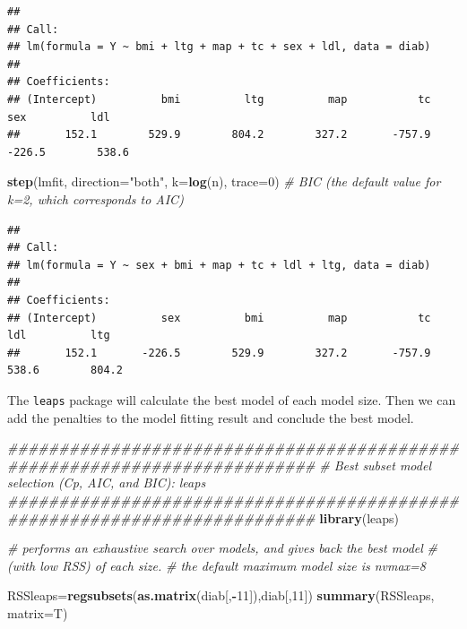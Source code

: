 \documentclass[
]{book}
\newenvironment{Shaded}{\begin{snugshade}}{\end{snugshade}}
\newcommand{\CommentTok}[1]{\textcolor[rgb]{0.56,0.35,0.01}{\textit{#1}}}
\newcommand{\DataTypeTok}[1]{\textcolor[rgb]{0.13,0.29,0.53}{#1}}
\newcommand{\DecValTok}[1]{\textcolor[rgb]{0.00,0.00,0.81}{#1}}
\newcommand{\KeywordTok}[1]{\textcolor[rgb]{0.13,0.29,0.53}{\textbf{#1}}}
\newcommand{\NormalTok}[1]{#1}
\newcommand{\OperatorTok}[1]{\textcolor[rgb]{0.81,0.36,0.00}{\textbf{#1}}}
\newcommand{\StringTok}[1]{\textcolor[rgb]{0.31,0.60,0.02}{#1}}
\begin{document}
\begin{verbatim}
## 
## Call:
## lm(formula = Y ~ bmi + ltg + map + tc + sex + ldl, data = diab)
## 
## Coefficients:
## (Intercept)          bmi          ltg          map           tc          sex          ldl  
##       152.1        529.9        804.2        327.2       -757.9       -226.5        538.6
\end{verbatim}

\begin{Shaded}
\begin{Highlighting}[]
    \KeywordTok{step}\NormalTok{(lmfit, }\DataTypeTok{direction=}\StringTok{"both"}\NormalTok{, }\DataTypeTok{k=}\KeywordTok{log}\NormalTok{(n), }\DataTypeTok{trace=}\DecValTok{0}\NormalTok{)  }\CommentTok{# BIC (the default value for k=2, which corresponds to AIC)}
\end{Highlighting}
\end{Shaded}

\begin{verbatim}
## 
## Call:
## lm(formula = Y ~ sex + bmi + map + tc + ldl + ltg, data = diab)
## 
## Coefficients:
## (Intercept)          sex          bmi          map           tc          ldl          ltg  
##       152.1       -226.5        529.9        327.2       -757.9        538.6        804.2
\end{verbatim}

The \texttt{leaps} package will calculate the best model of each model size. Then we can add the penalties to the model fitting result and conclude the best model.

\begin{Shaded}
\begin{Highlighting}[]
    \CommentTok{##########################################################################}
    \CommentTok{# Best subset model selection (Cp, AIC, and BIC): leaps }
    \CommentTok{##########################################################################}
    \KeywordTok{library}\NormalTok{(leaps)}
    
    \CommentTok{# performs an exhaustive search over models, and gives back the best model }
    \CommentTok{# (with low RSS) of each size.}
    \CommentTok{# the default maximum model size is nvmax=8}
    
\NormalTok{    RSSleaps=}\KeywordTok{regsubsets}\NormalTok{(}\KeywordTok{as.matrix}\NormalTok{(diab[,}\OperatorTok{-}\DecValTok{11}\NormalTok{]),diab[,}\DecValTok{11}\NormalTok{])}
    \KeywordTok{summary}\NormalTok{(RSSleaps, }\DataTypeTok{matrix=}\NormalTok{T)}
\end{Highlighting}
\end{Shaded}
\end{document}
